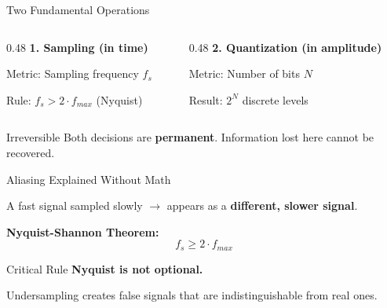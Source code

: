\documentclass[aspectratio=169,11pt]{beamer}
\begin{document}
\begin{frame}{Two Fundamental Operations}
    \begin{columns}[T]
        \begin{column}{0.48\textwidth}
            \textbf{1. Sampling (in time)}
            
            \vspace{0.2cm}
            Metric: Sampling frequency $f_s$
            
            \vspace{0.2cm}
            Rule: $f_s > 2 \cdot f_{max}$ (Nyquist)
        \end{column}
        \begin{column}{0.48\textwidth}
            \textbf{2. Quantization (in amplitude)}
            
            \vspace{0.2cm}
            Metric: Number of bits $N$
            
            \vspace{0.2cm}
            Result: $2^N$ discrete levels
        \end{column}
    \end{columns}
    
    \vspace{0.5cm}
    \begin{alertblock}{Irreversible}
        Both decisions are \textbf{permanent}. Information lost here cannot be recovered.
    \end{alertblock}
    
    \vspace{0.3cm}
    \footnotesize
    \cite{walden1999adc}
\end{frame}

\begin{frame}{Aliasing Explained Without Math}
    \begin{center}
        \Large
        A fast signal sampled slowly $\rightarrow$ appears as a \textbf{different, slower signal}.
    \end{center}
    
    \vspace{0.5cm}
    \textbf{Nyquist-Shannon Theorem:}
    \begin{equation}
        f_s \geq 2 \cdot f_{max}
    \end{equation}
    
    \vspace{0.3cm}
    \begin{alertblock}{Critical Rule}
        \textbf{Nyquist is not optional.}
        
        Undersampling creates false signals that are indistinguishable from real ones.
    \end{alertblock}
    
    \vspace{0.3cm}
    \footnotesize
    \cite{oppenheim1999discrete}
\end{frame}
\end{document}
